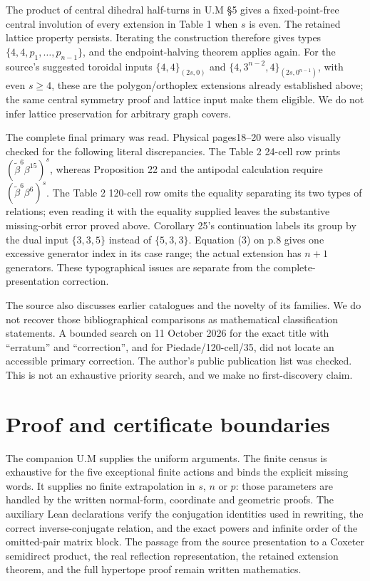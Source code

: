 The product of central dihedral half-turns in U.M §5 gives a fixed-point-free central involution of every extension in Table 1 when \(s\) is even. The retained lattice property persists. Iterating the construction therefore gives types \(\{4,4,p_1,\ldots,p_{n-1}\}\), and the endpoint-halving theorem applies again. For the source's suggested toroidal inputs \(\{4,4\}_{(2s,0)}\) and \(\{4,3^{n-2},4\}_{(2s,0^{n-1})}\), with even \(s\ge4\), these are the polygon/orthoplex extensions already established above; the same central symmetry proof and lattice input make them eligible. We do not infer lattice preservation for arbitrary graph covers.

The complete final primary was read. Physical pages18--20 were also visually checked for the following literal discrepancies. The Table 2 24-cell row prints \((\widetilde\beta^6\beta^{15})^s\), whereas Proposition 22 and the antipodal calculation require \((\widetilde\beta^6\beta^6)^s\). The Table 2 120-cell row omits the equality separating its two types of relations; even reading it with the equality supplied leaves the substantive missing-orbit error proved above. Corollary 25's continuation labels its group by the dual input \(\{3,3,5\}\) instead of \(\{5,3,3\}\). Equation (3) on p.8 gives one excessive generator index in its case range; the actual extension has \(n+1\) generators. These typographical issues are separate from the complete-presentation correction.

The source also discusses earlier catalogues and the novelty of its families. We do not recover those bibliographical comparisons as mathematical classification statements. A bounded search on 11 October 2026 for the exact title with ``erratum'' and ``correction'', and for Piedade/120-cell/35, did not locate an accessible primary correction. The author's public publication list was checked. This is not an exhaustive priority search, and we make no first-discovery claim.

\section{Proof and certificate boundaries}\label{proof-and-certificate-boundaries}

The companion U.M supplies the uniform arguments. The finite census is exhaustive for the five exceptional finite actions and binds the explicit missing words. It supplies no finite extrapolation in \(s\), \(n\) or \(p\): those parameters are handled by the written normal-form, coordinate and geometric proofs. The auxiliary Lean declarations verify the conjugation identities used in rewriting, the correct inverse-conjugate relation, and the exact powers and infinite order of the omitted-pair matrix block. The passage from the source presentation to a Coxeter semidirect product, the real reflection representation, the retained extension theorem, and the full hypertope proof remain written mathematics.

